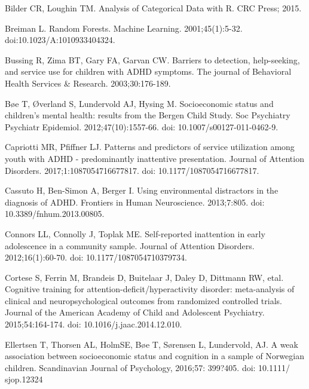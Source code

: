 \documentclass[10pt,letterpaper]{article}
\begin{document}
{{\begin{thebibliography}{10}

Bilder CR,  Loughin TM.
\newblock Analysis of Categorical Data with R.
\newblock CRC Press; 2015.

Breiman L.
\newblock Random Forests. 
\newblock Machine Learning. 2001;45(1):5-32. doi:10.1023/A:1010933404324.

Bussing R, Zima BT, Gary FA, Garvan CW.
\newblock Barriers to detection, help-seeking, and service use for children
  with {ADHD} symptoms.
\newblock The journal of Behavioral Health Services \& Research. 2003;30:176-189.

B\o{}e T, \O{}verland S, Lundervold AJ, Hysing M.
\newblock Socioeconomic status and children's mental health: results from the Bergen Child Study.
\newblock Soc Psychiatry Psychiatr Epidemiol. 2012;47(10):1557-66. doi: 10.1007/s00127-011-0462-9. 

Capriotti MR, Pfiffner LJ.
\newblock Patterns and predictors of service utilization among youth with
  {ADHD} - predominantly inattentive presentation.
\newblock Journal of Attention Disorders. 2017;1:1087054716677817. doi: 10.1177/1087054716677817.

Cassuto H, Ben-Simon A, Berger I.
\newblock Using environmental distractors in the diagnosis of {ADHD}.
\newblock Frontiers in Human Neuroscience. 2013;7:805. doi: 10.3389/fnhum.2013.00805.

Connors LL, Connolly J, Toplak ME.
\newblock Self-reported inattention in early adolescence in a community sample.
\newblock Journal of Attention Disorders.  2012;16(1):60-70. doi: 10.1177/1087054710379734.

Cortese S, Ferrin M, Brandeis D, Buitelaar J, Daley D,
  Dittmann RW, etal.
\newblock Cognitive training for attention-deficit/hyperactivity disorder:
  meta-analysis of clinical and neuropsychological outcomes from randomized
  controlled trials.
\newblock Journal of the American Academy of Child and Adolescent
  Psychiatry. 2015;54:164-174. doi: 10.1016/j.jaac.2014.12.010.
  
Ellertsen T, Thorsen AL, HolmSE, B\o{}e T, S\o{}rensen L, Lundervold,
AJ.
\newblock A weak association between socioeconomic status and cognition
in a sample of Norwegian children. 
\newblock Scandinavian Journal of Psychology, 2016;57: 399?405. doi: 10.1111/
sjop.12324
  

\end{thebibliography}}}
\end{document}

